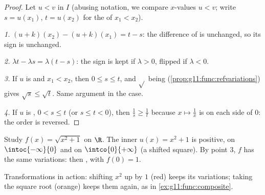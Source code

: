 \begin{proof}
Let $u < v$ in $I$ (abusing notation, we compare $x$-values $u < v$; write
$s = u(x_1)$, $t = u(x_2)$ for the  of $x_1 < x_2$).

\emph{1.} $(u+k)(x_2) - (u+k)(x_1) = t - s$: the difference of  is
unchanged, so its sign is unchanged.

\emph{2.} $\lambda t - \lambda s = \lambda(t - s)$: the sign is kept if
$\lambda > 0$, flipped if $\lambda < 0$.

\emph{3.} If $u$ is  and $x_1 < x_2$, then $0 \leq s \leq t$, and
$\sqrt{}$ being  (\cref{prop:g11:func:refvariations}) gives
$\sqrt s \leq \sqrt t$. Same argument in the  case.

\emph{4.} If $u$ is , $0 < s \leq t$ (or $s \leq t < 0$), then
$\frac1s \geq \frac1t$ because $x \mapsto \frac1x$ is  on each
side of $0$: the order is reversed.
\end{proof}

\begin{example}\label{ex:g11:func:composite}
Study $f(x) = \sqrt{x^2 + 1}$ on $\R$. The inner 
$u(x) = x^2 + 1$ is positive,  on $\intoc{-\infty}{0}$ and
 on $\intco{0}{+\infty}$ (a shifted square). By point 3, $f$
has the same variations:  then , with 
$f(0) = 1$.
\end{example}

\begin{omfigure}

{\small Transformations in action: shifting $x^2$ up by $1$ (red) keeps
its variations; taking the square root (orange) keeps them again, as in
\cref{ex:g11:func:composite}.}
\end{omfigure}

